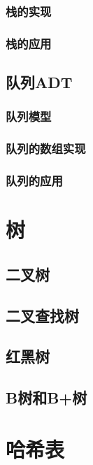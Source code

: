 \documentclass[oneside]{ctexbook}
\begin{document}
\subsection{栈的实现}

\subsection{栈的应用}

\section{队列ADT}

\subsection{队列模型}

\subsection{队列的数组实现}

\subsection{队列的应用}

\chapter{树}

\section{二叉树}

\section{二叉查找树}

\section{红黑树}

\section{B树和B+树}

\chapter{哈希表}
\end{document}
